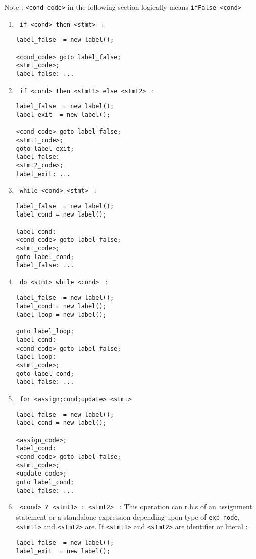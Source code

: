 \documentclass[12pt]{article}
\begin{document}
Note : \texttt{<cond\_code>} in the following section logically means \texttt{ifFalse <cond>}
\begin{enumerate}
\item \texttt{ if <cond> then <stmt> } :
\begin{verbatim}
label_false  = new label();

<cond_code> goto label_false;
<stmt_code>;
label_false: ...
\end{verbatim}


\item \texttt{ if <cond> then <stmt1> else <stmt2> } :
\begin{verbatim}
label_false  = new label();
label_exit  = new label();

<cond_code> goto label_false;
<stmt1_code>;
goto label_exit;
label_false:
<stmt2_code>;
label_exit: ...
\end{verbatim}


\item \texttt{ while <cond> <stmt> } :
\begin{verbatim}
label_false  = new label();
label_cond = new label();

label_cond:
<cond_code> goto label_false;
<stmt_code>;
goto label_cond;
label_false: ...
\end{verbatim}


\item \texttt{ do <stmt> while <cond> } :
\begin{verbatim}
label_false  = new label();
label_cond = new label();
label_loop = new label();

goto label_loop;
label_cond:
<cond_code> goto label_false;
label_loop:
<stmt_code>;
goto label_cond;
label_false: ...

\end{verbatim}


\item \texttt{ for <assign;cond;update>  <stmt> }
\begin{verbatim}
label_false  = new label();
label_cond = new label();

<assign_code>;
label_cond:
<cond_code> goto label_false;
<stmt_code>;
<update_code>;
goto label_cond;
label_false: ...

\end{verbatim}

\item \texttt{ <cond> ? <stmt1> : <stmt2> } : This operation can r.h.s of an assignment statement or a standalone expression depending upon type of \texttt{exp\_node}, \texttt{<stmt1>} and \texttt{<stmt2>} are.
If \texttt{<stmt1>} and \texttt{<stmt2>} are identifier or literal :  
\begin{verbatim}
label_false  = new label();
label_exit  = new label();


\end{verbatim}
\end{enumerate}
\end{document}
